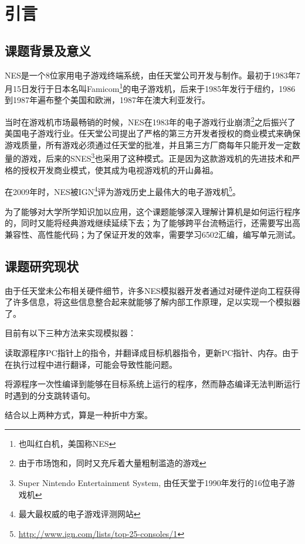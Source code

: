 \documentclass[a4paper]{ltxdoc}
\begin{document}
{
\setcounter{page}{1}
\pretocmd{\section}{\clearpage \vspace*{-2.0em}}{}{}

\setlength{\parindent}{2em}
\setlength{\parskip}{0.5em}
\setlength{\baselineskip}{22pt}

\section{引言}
\subsection{课题背景及意义}
NES是一个8位家用电子游戏终端系统，由任天堂公司开发与制作。最初于1983年7月15日发行于日本名叫Famicom\footnote{也叫红白机，美国称NES}的电子游戏机，后来于1985年发行于纽约，1986到1987年遍布整个美国和欧洲，1987年在澳大利亚发行。

当时在游戏机市场最畅销的时候，NES在1983年的电子游戏行业崩溃\footnote{由于市场饱和，同时又充斥着大量粗制滥造的游戏}之后振兴了美国电子游戏行业。任天堂公司提出了严格的第三方开发者授权的商业模式来确保游戏质量，所有游戏必须通过任天堂的批准，并且第三方厂商每年只能开发一定数量的游戏，后来的SNES\footnote{Super Nintendo Entertainment System, 由任天堂于1990年发行的16位电子游戏机}也采用了这种模式。正是因为这款游戏机的先进技术和严格的授权开发商业模式，使其成为电视游戏机的开山鼻祖。

在2009年时，NES被IGN\footnote{最大最权威的电子游戏评测网站}评为游戏历史上最伟大的电子游戏机\footnote{\url{http://www.ign.com/lists/top-25-consoles/1}}。

为了能够对大学所学知识加以应用，这个课题能够深入理解计算机是如何运行程序的，同时又能将经典游戏继续延续下去；为了能够跨平台流畅运行，还需要写出高兼容性、高性能代码；为了保证开发的效率，需要学习6502汇编，编写单元测试。

\subsection{课题研究现状}
由于任天堂未公布相关硬件细节，许多NES模拟器开发者通过对硬件逆向工程获得了许多信息，将这些信息整合起来就能够了解内部工作原理，足以实现一个模拟器了。

目前有以下三种方法来实现模拟器：
\begin{description}[align=left]
	\item [直接翻译] 读取源程序PC指针上的指令，并翻译成目标机器指令，更新PC指针、内存。由于在执行过程中进行翻译，可能会导致性能问题。
	\item [静态编译] 将源程序一次性编译到能够在目标系统上运行的程序，然而静态编译无法判断运行时遇到的分支跳转语句。
	\item [动态编译] 结合以上两种方式，算是一种折中方案。
\end{description}

}
\end{document}
